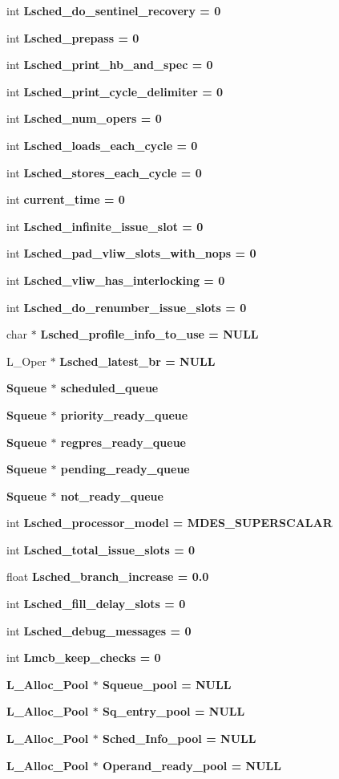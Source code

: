 \begin{CompactItemize}
int \bf{Lsched\_\-do\_\-sentinel\_\-recovery} = 0
\item 
int \bf{Lsched\_\-prepass} = 0
\item 
int \bf{Lsched\_\-print\_\-hb\_\-and\_\-spec} = 0
\item 
int \bf{Lsched\_\-print\_\-cycle\_\-delimiter} = 0
\item 
int \bf{Lsched\_\-num\_\-opers} = 0
\item 
int \bf{Lsched\_\-loads\_\-each\_\-cycle} = 0
\item 
int \bf{Lsched\_\-stores\_\-each\_\-cycle} = 0
\item 
int \bf{current\_\-time} = 0
\item 
int \bf{Lsched\_\-infinite\_\-issue\_\-slot} = 0
\item 
int \bf{Lsched\_\-pad\_\-vliw\_\-slots\_\-with\_\-nops} = 0
\item 
int \bf{Lsched\_\-vliw\_\-has\_\-interlocking} = 0
\item 
int \bf{Lsched\_\-do\_\-renumber\_\-issue\_\-slots} = 0
\item 
char $\ast$ \bf{Lsched\_\-profile\_\-info\_\-to\_\-use} = \bf{NULL}
\item 
L\_\-Oper $\ast$ \bf{Lsched\_\-latest\_\-br} = \bf{NULL}
\item 
\bf{Squeue} $\ast$ \bf{scheduled\_\-queue}
\item 
\bf{Squeue} $\ast$ \bf{priority\_\-ready\_\-queue}
\item 
\bf{Squeue} $\ast$ \bf{regpres\_\-ready\_\-queue}
\item 
\bf{Squeue} $\ast$ \bf{pending\_\-ready\_\-queue}
\item 
\bf{Squeue} $\ast$ \bf{not\_\-ready\_\-queue}
\item 
int \bf{Lsched\_\-processor\_\-model} = MDES\_\-SUPERSCALAR
\item 
int \bf{Lsched\_\-total\_\-issue\_\-slots} = 0
\item 
float \bf{Lsched\_\-branch\_\-increase} = 0.0
\item 
int \bf{Lsched\_\-fill\_\-delay\_\-slots} = 0
\item 
int \bf{Lsched\_\-debug\_\-messages} = 0
\item 
int \bf{Lmcb\_\-keep\_\-checks} = 0
\item 
\bf{L\_\-Alloc\_\-Pool} $\ast$ \bf{Squeue\_\-pool} = \bf{NULL}
\item 
\bf{L\_\-Alloc\_\-Pool} $\ast$ \bf{Sq\_\-entry\_\-pool} = \bf{NULL}
\item 
\bf{L\_\-Alloc\_\-Pool} $\ast$ \bf{Sched\_\-Info\_\-pool} = \bf{NULL}
\item 
\bf{L\_\-Alloc\_\-Pool} $\ast$ \bf{Operand\_\-ready\_\-pool} = \bf{NULL}
\end{CompactItemize}


